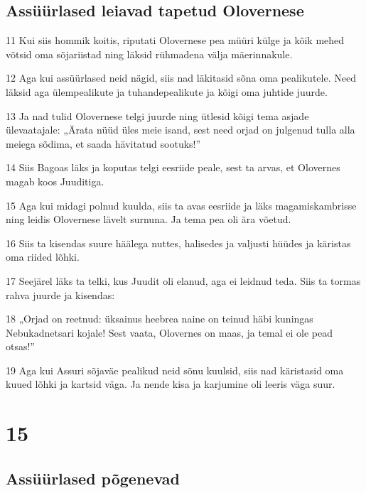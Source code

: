 \section*{Assüürlased leiavad tapetud Olovernese}

\par 11 Kui siis hommik koitis, riputati Olovernese pea müüri külge ja kõik mehed võtsid oma sõjariistad ning läksid rühmadena välja mäerinnakule.
\par 12 Aga kui assüürlased neid nägid, siis nad läkitasid sõna oma pealikutele. Need läksid aga ülempealikute ja tuhandepealikute ja kõigi oma juhtide juurde.
\par 13 Ja nad tulid Olovernese telgi juurde ning ütlesid kõigi tema asjade ülevaatajale: „Ärata nüüd üles meie isand, sest need orjad on julgenud tulla alla meiega sõdima, et saada hävitatud sootuks!”
\par 14 Siis Bagoas läks ja koputas telgi eesriide peale, sest ta arvas, et Olovernes magab koos Juuditiga.
\par 15 Aga kui midagi polnud kuulda, siis ta avas eesriide ja läks magamiskambrisse ning leidis Olovernese lävelt surnuna. Ja tema pea oli ära võetud.
\par 16 Siis ta kisendas suure häälega nuttes, halisedes ja valjusti hüüdes ja käristas oma riided lõhki.
\par 17 Seejärel läks ta telki, kus Juudit oli elanud, aga ei leidnud teda. Siis ta tormas rahva juurde ja kisendas:
\par 18 „Orjad on reetnud: üksainus heebrea naine on teinud häbi kuningas Nebukadnetsari kojale! Sest vaata, Olovernes on maas, ja temal ei ole pead otsas!”
\par 19 Aga kui Assuri sõjaväe pealikud neid sõnu kuulsid, siis nad käristasid oma kuued lõhki ja kartsid väga. Ja nende kisa ja karjumine oli leeris väga suur.


\chapter{15}

\section*{Assüürlased põgenevad}

